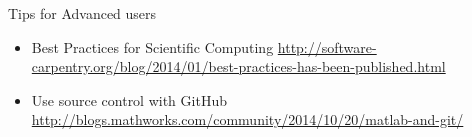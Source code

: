 \documentclass[10pt]{beamer}
\begin{document}
\begin{frame}{Tips for Advanced users}
\begin{itemize}
\item Best Practices for Scientific Computing \url{http://software-carpentry.org/blog/2014/01/best-practices-has-been-published.html}
\item Use source control with GitHub\\ \url{http://blogs.mathworks.com/community/2014/10/20/matlab-and-git/}
\end{itemize}
\end{frame}
\end{document}
